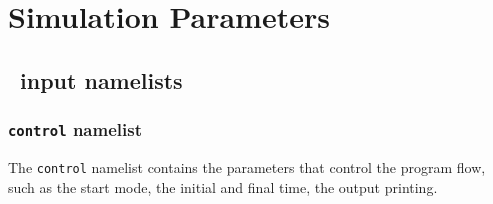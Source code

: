 \section{Simulation Parameters}
\label{section:input_par}

\subsection{\PDAC\ input namelists}
\label{section:namelists}

\subsubsection{{\tt control} namelist}
The {\tt control} namelist contains the parameters that control the program
flow, such as the start mode, the initial and final time, the output printing.


